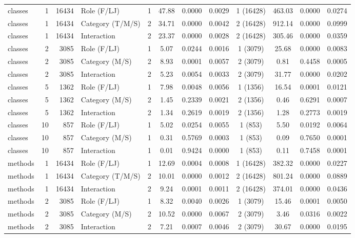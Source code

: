 \begin{table}[H]
{\begin{tabular}{l r r l ccc r ccc r}
classes & 1 & 16434 & Role (F/LJ) & 1 & 47.88 & 0.0000 & 0.0029 & 1 (16428) & 463.03 & 0.0000 & 0.0274 \\ 
classes & 1 & 16434 & Category (T/M/S) & 2 & 34.71 & 0.0000 & 0.0042 & 2 (16428) & 912.14 & 0.0000 & 0.0999 \\ 
classes & 1 & 16434 & Interaction & 2 & 23.37 & 0.0000 & 0.0028 & 2 (16428) & 305.46 & 0.0000 & 0.0359 \\ 
classes & 2 & 3085 & Role (F/LJ) & 1 & 5.07 & 0.0244 & 0.0016 & 1 (3079) & 25.68 & 0.0000 & 0.0083 \\ 
classes & 2 & 3085 & Category (M/S) & 2 & 8.93 & 0.0001 & 0.0057 & 2 (3079) & 0.81 & 0.4458 & 0.0005 \\ 
classes & 2 & 3085 & Interaction & 2 & 5.23 & 0.0054 & 0.0033 & 2 (3079) & 31.77 & 0.0000 & 0.0202 \\ 
classes & 5 & 1362 & Role (F/LJ) & 1 & 7.98 & 0.0048 & 0.0056 & 1 (1356) & 16.54 & 0.0001 & 0.0121 \\ 
classes & 5 & 1362 & Category (M/S) & 2 & 1.45 & 0.2339 & 0.0021 & 2 (1356) & 0.46 & 0.6291 & 0.0007 \\ 
classes & 5 & 1362 & Interaction & 2 & 1.34 & 0.2619 & 0.0019 & 2 (1356) & 1.28 & 0.2773 & 0.0019 \\ 
classes & 10 & 857 & Role (F/LJ) & 1 & 5.02 & 0.0254 & 0.0055 & 1 (853) & 5.50 & 0.0192 & 0.0064 \\ 
classes & 10 & 857 & Category (M/S) & 1 & 0.31 & 0.5769 & 0.0003 & 1 (853) & 0.09 & 0.7650 & 0.0001 \\ 
classes & 10 & 857 & Interaction & 1 & 0.01 & 0.9424 & 0.0000 & 1 (853) & 0.11 & 0.7458 & 0.0001 \\ 
methods & 1 & 16434 & Role (F/LJ) & 1 & 12.69 & 0.0004 & 0.0008 & 1 (16428) & 382.32 & 0.0000 & 0.0227 \\ 
methods & 1 & 16434 & Category (T/M/S) & 2 & 10.01 & 0.0000 & 0.0012 & 2 (16428) & 801.24 & 0.0000 & 0.0889 \\ 
methods & 1 & 16434 & Interaction & 2 & 9.24 & 0.0001 & 0.0011 & 2 (16428) & 374.01 & 0.0000 & 0.0436 \\ 
methods & 2 & 3085 & Role (F/LJ) & 1 & 8.32 & 0.0040 & 0.0026 & 1 (3079) & 15.46 & 0.0001 & 0.0050 \\ 
methods & 2 & 3085 & Category (M/S) & 2 & 10.52 & 0.0000 & 0.0067 & 2 (3079) & 3.46 & 0.0316 & 0.0022 \\ 
methods & 2 & 3085 & Interaction & 2 & 7.21 & 0.0007 & 0.0046 & 2 (3079) & 30.67 & 0.0000 & 0.0195 \\ 

\end{tabular}}
\end{table}
